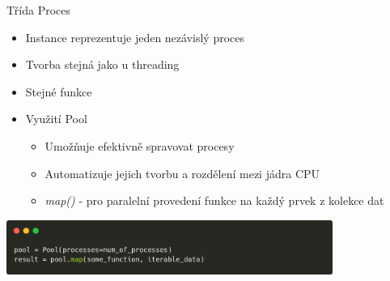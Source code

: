 \documentclass{beamer}
\begin{document}
\begin{frame}[fragile]{Třída Proces}
    \begin{itemize}
        \item Instance reprezentuje jeden nezávislý proces
        \item Tvorba stejná jako u threading
        \item Stejné funkce
        \vskip 0.25in

        \item Využití Pool
        \begin{itemize}
            \item Umožňuje efektivně spravovat procesy
            \item Automatizuje jejich tvorbu a rozdělení mezi jádra CPU
            \item \textit{map()} - pro paralelní provedení funkce na každý prvek z kolekce dat
        \end{itemize}
    \end{itemize}
    \scriptsize

    \begin{center}
        \includegraphics[width=0.8\textwidth]{obrazky/codes/carbon7.png}
    \end{center}
\end{frame}
\end{document}
